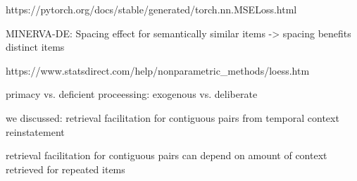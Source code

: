 https://pytorch.org/docs/stable/generated/torch.nn.MSELoss.html 

MINERVA-DE: Spacing effect for semantically similar items -> spacing benefits distinct items 

https://www.statsdirect.com/help/nonparametric_methods/loess.htm

primacy vs. deficient proceessing: exogenous vs. deliberate 

we discussed: retrieval facilitation for contiguous pairs from temporal context reinstatement

retrieval facilitation for contiguous pairs can depend on amount of context retrieved for repeated items